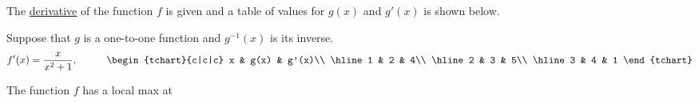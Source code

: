\documentclass{ximera}
\author{Gregory Hartman \and Matthew Carr}
\begin{document}
\begin{exercise}



The \underline{derivative} of the function $f$ is given and a table of values for $g(x)$ and $g'(x)$ is shown below.

Suppose that $g$ is a one-to-one function and $g^{-1}(x)$ is its inverse.
\[
f'(x)=\frac{x}{x^2+1},\hskip 1cm
\begin{tchart}{c|c|c}
x & g(x) & g'(x)\\ \hline
1 & 2 & 4\\ \hline
2 & 3 & 5\\ \hline
3 & 4 & 1
\end{tchart}
\]

The function $f$ has a local max at
\begin{prompt}
\begin{multipleChoice}
\end{multipleChoice}
\end{prompt}

\end{exercise}
\end{document}
